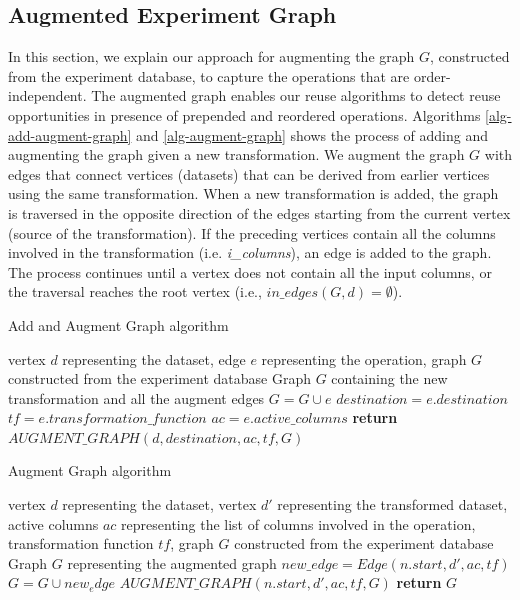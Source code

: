 \subsection{Augmented Experiment Graph}
In this section, we explain our approach for augmenting the graph $G$, constructed from the experiment database, to capture the operations that are order-independent.
The augmented graph enables our reuse algorithms to detect reuse opportunities in presence of prepended and reordered operations.
Algorithms \ref{alg-add-augment-graph} and \ref{alg-augment-graph} shows the process of adding and augmenting the graph given a new transformation.
We augment the graph $G$ with edges that connect vertices (datasets) that can be derived from earlier vertices using the same transformation.
When a new transformation is added, the graph is traversed in the opposite direction of the edges starting from the current vertex (source of the transformation).
If the preceding vertices contain all the columns involved in the transformation (i.e. \textit{i\_columns}), an edge is added to the graph.
The process continues until a vertex does not contain all the input columns, or the traversal reaches the root vertex (i.e., $in\_edges(G,d) = \emptyset$).

\begin{algorithm}
\caption{Add and Augment Graph algorithm}\label{alg-add-augment-graph}
\begin{algorithmic}[1]
\Require vertex $d$ representing the dataset, edge $e$ representing the operation, graph $G$ constructed from the experiment database
\Ensure Graph $G$ containing the new transformation and all the augment edges
	\State $G = G \cup e$ 
	\State $destination = e.destination$ 
	\State $tf=e.transformation\_function$ 
	\State $ac=e.active\_columns$ 
	\State \textbf{return} $AUGMENT\_GRAPH(d, destination,ac, tf, G)$   
\EndFunction
\end{algorithmic}
\end{algorithm}

\begin{algorithm}
\caption{Augment Graph algorithm}\label{alg-augment-graph}
\begin{algorithmic}[1]
\Require vertex $d$ representing the dataset, vertex $d'$ representing the transformed dataset, active columns $ac$ representing the list of columns involved in the operation, transformation function $tf$, graph $G$ constructed from the experiment database
\Ensure Graph $G$ representing the augmented graph
			\State  $new\_edge=Edge(n.start, d', ac,tf)$
			\State $G = G \cup new_edge$
			\State  $AUGMENT\_GRAPH(n.start, d',ac, tf,G)$
		\EndIf
	\EndFor
   \State \textbf{return} $G$
\EndFunction
\end{algorithmic}
\end{algorithm}


